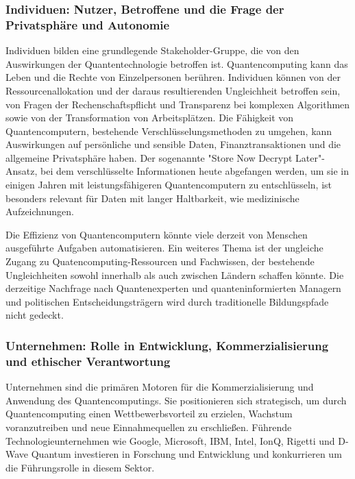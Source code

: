 \subsubsection{Individuen: Nutzer, Betroffene und die Frage der Privatsphäre und Autonomie}
Individuen bilden eine grundlegende Stakeholder-Gruppe, die von den Auswirkungen der Quantentechnologie betroffen ist. Quantencomputing kann das Leben und die Rechte von Einzelpersonen berühren. Individuen können von der Ressourcenallokation und der daraus resultierenden Ungleichheit betroffen sein, von Fragen der Rechenschaftspflicht und Transparenz bei komplexen Algorithmen sowie von der Transformation von Arbeitsplätzen.\cite{noauthor_quantum_nodate-2} Die Fähigkeit von Quantencomputern, bestehende Verschlüsselungsmethoden zu umgehen, kann Auswirkungen auf persönliche und sensible Daten, Finanztransaktionen und die allgemeine Privatsphäre haben. \cite{bond_quantum_2025} Der sogenannte "Store Now Decrypt Later"-Ansatz, bei dem verschlüsselte Informationen heute abgefangen werden, um sie in einigen Jahren mit leistungsfähigeren Quantencomputern zu entschlüsseln, ist besonders relevant für Daten mit langer Haltbarkeit, wie medizinische Aufzeichnungen.\cite{noauthor_ethics_nodate-1} 

Die Effizienz von Quantencomputern könnte viele derzeit von Menschen ausgeführte Aufgaben automatisieren. Ein weiteres Thema ist der ungleiche Zugang zu Quatencomputing-Ressourcen und Fachwissen, der bestehende Ungleichheiten sowohl innerhalb als auch zwischen Ländern schaffen könnte.\cite{noauthor_quantum_nodate-2} Die derzeitige Nachfrage nach Quantenexperten und quanteninformierten Managern und politischen Entscheidungsträgern wird durch traditionelle Bildungspfade nicht gedeckt.\cite{noauthor_what_nodate} 

\subsubsection{Unternehmen: Rolle in Entwicklung, Kommerzialisierung und ethischer Verantwortung}
Unternehmen sind die primären Motoren für die Kommerzialisierung und Anwendung des Quantencomputings. Sie positionieren sich strategisch, um durch Quantencomputing einen Wettbewerbsvorteil zu erzielen, Wachstum voranzutreiben und neue Einnahmequellen zu erschließen.\cite{noauthor_how_2025} Führende Technologieunternehmen wie Google, Microsoft, IBM, Intel, IonQ, Rigetti und D-Wave Quantum investieren in Forschung und Entwicklung und konkurrieren um die Führungsrolle in diesem Sektor.\cite{noauthor_europes_2025}

